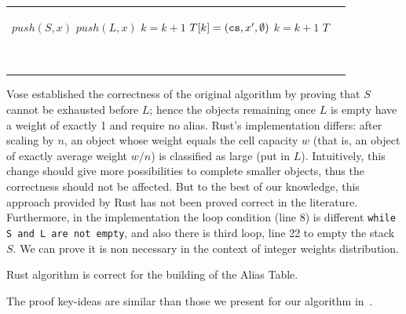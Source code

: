 \begin{algorithm}[htb]
\begin{tabular}{l l}
\begin{minipage}{0.5\textwidth}
\begin{algorithmic}[1]
                        \If{$0 < \bar{W}[x] \leq \cs$}
                            \State $push(S, x)$ %
                        \ElsIf{$\bar{W}[x] > \cs$}
                            \State $push(L, x)$
                        \EndIf
                        \State $k = k + 1$
                    \EndWhile
                    \For{$x' \in S$}
                        \State $T[k] = (\texttt{cs}, x', \emptyset)$ \Comment{objects still in $S$ have a remaining weight equal to $\cs$}
                        \State $k = k + 1$
                    \EndFor
                    \State \Return $T$
                \EndFunction
            \end{algorithmic}
            
            \vspace*{2mm}
            $\;$
            
        \end{minipage}
    \end{tabular}
 \end{algorithm}

Vose established the correctness of the original algorithm by proving that $S$ cannot be exhausted before $L$; hence the objects remaining once $L$ is empty have a weight of exactly 1 and require no alias.
Rust's implementation differs: after scaling by $n$, an object whose weight equals the cell capacity $w$ (that is, an object of exactly average weight $w/n$) is classified as large (put in $L$). Intuitively,
this change should give more possibilities to complete smaller objects, thus the correctness
should not be affected.
But to the best of our knowledge, this approach provided by Rust has not been proved correct in the literature.
Furthermore, in the implementation the loop condition (line 8) is different \texttt{while S and L are not empty}, and also there is third loop, line 22 to empty the stack $S$.
We can prove it is non necessary in the context of integer weights distribution.

\begin{proposition}
    Rust algorithm is correct for the building of the Alias Table.
\end{proposition}
The proof key-ideas are similar than those we present for our algorithm in~.

